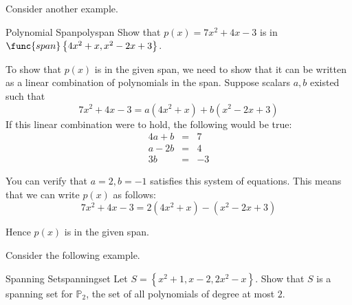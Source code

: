 Consider another example. 

\begin{example}{Polynomial Span}{polyspan}
Show that $p(x) = 7x^2 + 4x - 3$ is in $\func{span}\left\{ 4x^2 + x, x^2 -2x + 3 \right\}$. 
\end{example}

\begin{solution}
To show that $p(x)$ is in the given span, we need to show that it can be written as a linear combination of polynomials in the span. Suppose scalars $a, b$ existed such that 
\[
7x^2 +4x - 3= a(4x^2+x) + b (x^2-2x+3) 
\]
If this linear combination were to hold, the following would be true:
\begin{eqnarray*}
4a + b &=& 7 \\
a - 2b &=& 4 \\
3b &=& -3 
\end{eqnarray*}

You can verify that $a = 2, b = -1$ satisfies this system of equations. This means that we can write $p(x)$ as follows:
\[
 7x^2 +4x-3= 2(4x^2+x)  - (x^2-2x+3) 
\]

Hence $p(x)$ is in the given span.
\end{solution}

Consider the following example.

\begin{example}{Spanning Set}{spanningset}
Let $S = \left\{ x^2 + 1, x-2, 2x^2 - x \right\}$. Show that $S$ is a spanning set for $\mathbb{P}_2$, the set of all polynomials of degree at most $2$. 
\end{example}

